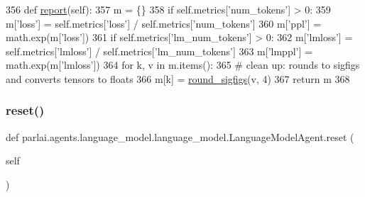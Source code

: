\begin{DoxyCode}
356     \textcolor{keyword}{def }\hyperlink{namespaceprojects_1_1convai2_1_1eval__f1_a01a47b9c08dad189837a51f085defc45}{report}(self):
357         m = \{\}
358         \textcolor{keywordflow}{if} self.metrics[\textcolor{stringliteral}{'num\_tokens'}] > 0:
359             m[\textcolor{stringliteral}{'loss'}] = self.metrics[\textcolor{stringliteral}{'loss'}] / self.metrics[\textcolor{stringliteral}{'num\_tokens'}]
360             m[\textcolor{stringliteral}{'ppl'}] = math.exp(m[\textcolor{stringliteral}{'loss'}])
361         \textcolor{keywordflow}{if} self.metrics[\textcolor{stringliteral}{'lm\_num\_tokens'}] > 0:
362             m[\textcolor{stringliteral}{'lmloss'}] = self.metrics[\textcolor{stringliteral}{'lmloss'}] / self.metrics[\textcolor{stringliteral}{'lm\_num\_tokens'}]
363             m[\textcolor{stringliteral}{'lmppl'}] = math.exp(m[\textcolor{stringliteral}{'lmloss'}])
364         \textcolor{keywordflow}{for} k, v \textcolor{keywordflow}{in} m.items():
365             \textcolor{comment}{# clean up: rounds to sigfigs and converts tensors to floats}
366             m[k] = \hyperlink{namespaceparlai_1_1agents_1_1legacy__agents_1_1seq2seq_1_1utils__v0_af377ec61bfc0423461e7b409ffc883b9}{round\_sigfigs}(v, 4)
367         \textcolor{keywordflow}{return} m
368 
\end{DoxyCode}
\mbox{\label{classparlai_1_1agents_1_1language__model_1_1language__model_1_1LanguageModelAgent_ae4ccc140cc9d528c4135ec65f2bb4325}} 
\subsubsection{\texorpdfstring{reset()}{reset()}}
{\footnotesize\ttfamily def parlai.\+agents.\+language\+\_\+model.\+language\+\_\+model.\+Language\+Model\+Agent.\+reset (\begin{DoxyParamCaption}\item[{}]{self }\end{DoxyParamCaption})}

